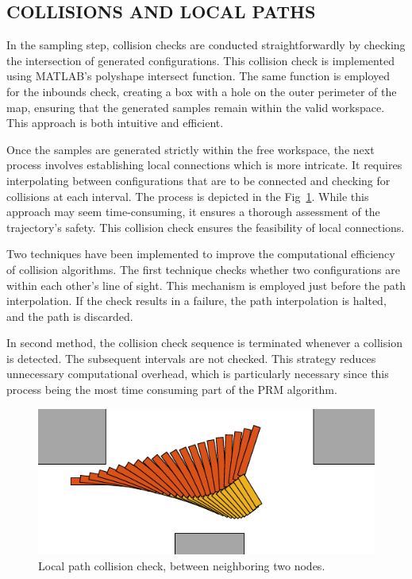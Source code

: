 \documentclass{IEEEtaes}
\begin{document}
\subsection{\fontsize{10}{13}\selectfont COLLISIONS AND LOCAL PATHS}
In the sampling step, collision checks are conducted straightforwardly by checking the intersection of generated configurations. This collision check is implemented using MATLAB's polyshape intersect function. The same function is employed for the inbounds check, creating a box with a hole on the outer perimeter of the map, ensuring that the generated samples remain within the valid workspace. This approach is both intuitive and efficient.

Once the samples are generated strictly within the free workspace, the next process involves establishing local connections which is more intricate.  It requires interpolating between configurations that are to be connected and checking for collisions at each interval. The process is depicted in the Fig~\ref{local-path}. While this approach may seem time-consuming, it ensures a thorough assessment of the trajectory's safety. This collision check ensures the feasibility of local connections.

Two techniques have been implemented to improve the computational efficiency of collision algorithms. The first technique checks whether two configurations are within each other's line of sight. This mechanism is employed just before the path interpolation. If the check results in a failure, the path interpolation is halted, and the path is discarded.

In second method, the collision check sequence is terminated whenever a collision is detected. The subsequent intervals are not checked. This strategy reduces unnecessary computational overhead, which is particularly necessary since this process being the most time consuming part of the PRM algorithm.

\begin{figure}[b]
    \vspace{0.75em}
    \begin{center}
        \includegraphics[width=0.9\linewidth]{figures/LOCALPATH.pdf}
     \end{center}
     \caption{Local path collision check, between neighboring two nodes.}
     \label{local-path}
\end{figure}
\end{document}
